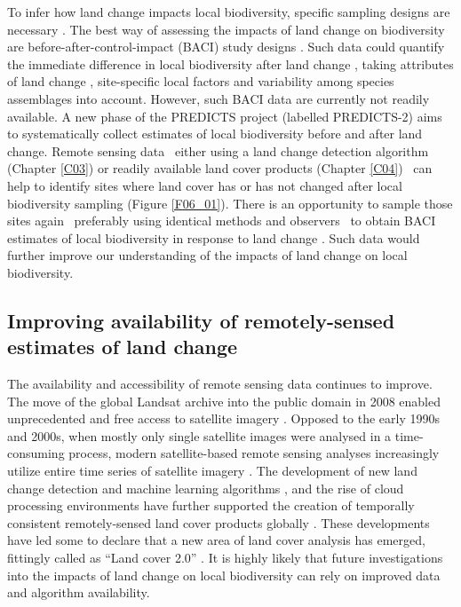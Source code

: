 To infer how land change impacts local biodiversity, specific sampling designs are necessary \citep{DePalma2018}. The best way of assessing the impacts of land change on biodiversity are before-after-control-impact (BACI) study designs \citep{Cardinale2018,DePalma2018}. Such data could quantify the immediate difference in local biodiversity after land change \citep{Ratajczak2018}, taking attributes of land change \citep{Watson2014}, site-specific local factors \citep{Jung2016} and variability among species assemblages \citep{Dornelas2013,Franca2016} into account. However, such BACI data are currently not readily available. A new phase of the PREDICTS project (labelled PREDICTS-2) aims to systematically collect estimates of local biodiversity before and after land change. Remote sensing data \textendash\ either using a land change detection algorithm (Chapter \ref{C03}) or readily available land cover products (Chapter \ref{C04}) \textendash\ can help to identify sites where land cover has or has not changed after local biodiversity sampling (Figure \ref{F06_01}). There is an opportunity to sample those sites again \textendash\ preferably using identical methods and observers \textendash\ to obtain BACI estimates of local biodiversity in response to land change \citep{DePalma2018}. Such data would further improve our understanding of the impacts of land change on local biodiversity.

\subsection{Improving availability of remotely-sensed estimates of land change}
\label{C06_0304}

The availability and accessibility of remote sensing data continues to improve. The move of the global Landsat archive into the public domain in 2008 enabled unprecedented and free access to satellite imagery \citep{Wulder2015}. Opposed to the early 1990s and 2000s, when mostly only single satellite images were analysed in a time-consuming process, modern satellite-based remote sensing analyses increasingly utilize entire time series of satellite imagery \citep{Kennedy2014,Hermosilla2015a}. The development of new land change detection \citep{Coppin2004,Abercrombie2016,Zhu2017} and machine learning algorithms \citep{Maxwell2018}, and the rise of cloud processing environments \citep{Gorelick2017} have further supported the creation of temporally consistent remotely-sensed land cover products globally \citep{ESA2017,Hermosilla2018,Sulla-Menashe2019}. These developments have led some to declare that a new area of land cover analysis has emerged, fittingly called as “Land cover 2.0” \citep{Wulder2018}. It is highly likely that future investigations into the impacts of land change on local biodiversity can rely on improved data and algorithm availability.

